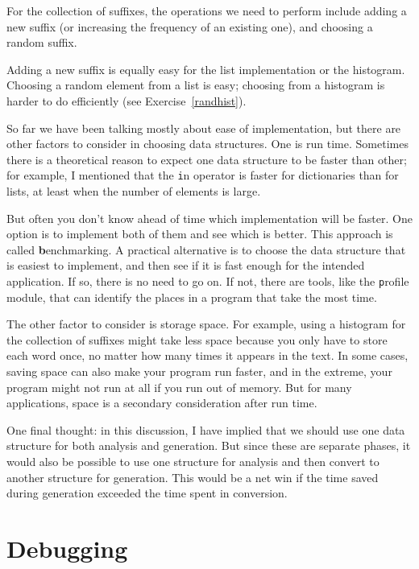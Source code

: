 \documentclass[
DIV=11,
fontsize=13,
twoside,
headinclude=false,
titlepage=firstiscover,
abstract=true,
headsepline=true,
footsepline=true,
chapterprefix=true, %
headings=big,
bibliography=totoc,%
captions=tableheading
]{scrbook}
\theoremstyle{definition}
\begin{document}
For the collection of suffixes, the operations we need to
perform include adding a new suffix (or increasing the frequency
of an existing one), and choosing a random suffix.

Adding a new suffix is equally easy for the list implementation
or the histogram.  Choosing a random element from a list
is easy; choosing from a histogram is harder to do
efficiently (see Exercise~\ref{randhist}).

So far we have been talking mostly about ease of implementation,
but there are other factors to consider in choosing data structures.
One is run time.  Sometimes there is a theoretical reason to expect
one data structure to be faster than other; for example, I mentioned
that the {\texttt in} operator is faster for dictionaries than for lists,
at least when the number of elements is large.

But often you don't know ahead of time which implementation will
be faster.  One option is to implement both of them and see which
is better.  This approach is called {\textbf benchmarking}.  A practical
alternative is to choose the data structure that is
easiest to implement, and then see if it is fast enough for the
intended application.  If so, there is no need to go on.  If not,
there are tools, like the {\texttt profile} module, that can identify
the places in a program that take the most time.

The other factor to consider is storage space.  For example, using a
histogram for the collection of suffixes might take less space because
you only have to store each word once, no matter how many times it
appears in the text.  In some cases, saving space can also make your
program run faster, and in the extreme, your program might not run at
all if you run out of memory.  But for many applications, space is a
secondary consideration after run time.

One final thought: in this discussion, I have implied that
we should use one data structure for both analysis and generation.  But
since these are separate phases, it would also be possible to use one
structure for analysis and then convert to another structure for
generation.  This would be a net win if the time saved during
generation exceeded the time spent in conversion.


\section{Debugging}
\end{document}
